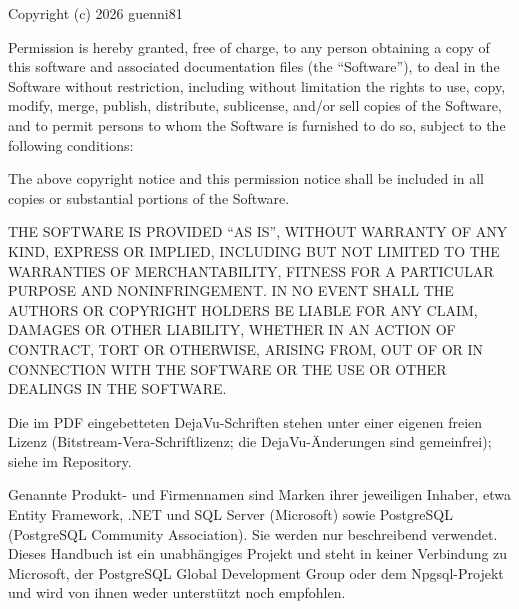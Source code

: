 Copyright (c) 2026 guenni81

Permission is hereby granted, free of charge, to any person obtaining a copy of this
software and associated documentation files (the “Software”), to deal in the Software
without restriction, including without limitation the rights to use, copy, modify, merge,
publish, distribute, sublicense, and/or sell copies of the Software, and to permit persons
to whom the Software is furnished to do so, subject to the following conditions:

The above copyright notice and this permission notice shall be included in all copies or
substantial portions of the Software.

THE SOFTWARE IS PROVIDED “AS IS”, WITHOUT WARRANTY OF ANY KIND, EXPRESS OR IMPLIED,
INCLUDING BUT NOT LIMITED TO THE WARRANTIES OF MERCHANTABILITY, FITNESS FOR A PARTICULAR
PURPOSE AND NONINFRINGEMENT. IN NO EVENT SHALL THE AUTHORS OR COPYRIGHT HOLDERS BE LIABLE
FOR ANY CLAIM, DAMAGES OR OTHER LIABILITY, WHETHER IN AN ACTION OF CONTRACT, TORT OR
OTHERWISE, ARISING FROM, OUT OF OR IN CONNECTION WITH THE SOFTWARE OR THE USE OR OTHER
DEALINGS IN THE SOFTWARE.

Die im PDF eingebetteten DejaVu-Schriften stehen unter einer eigenen freien Lizenz
(Bitstream-Vera-Schriftlizenz; die DejaVu-Änderungen sind gemeinfrei); siehe
im Repository.

Genannte Produkt- und Firmennamen sind Marken ihrer jeweiligen Inhaber, etwa Entity
Framework, .NET und SQL Server (Microsoft) sowie PostgreSQL (PostgreSQL Community
Association). Sie werden nur beschreibend verwendet. Dieses Handbuch ist ein unabhängiges
Projekt und steht in keiner Verbindung zu Microsoft, der PostgreSQL Global Development Group
oder dem Npgsql-Projekt und wird von ihnen weder unterstützt noch empfohlen.
